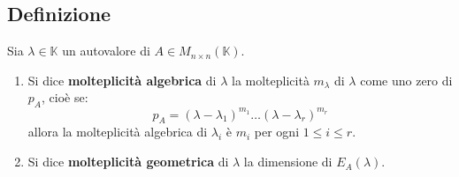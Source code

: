 \documentclass[a4paper]{article}
\theoremstyle{break}
\theoremstyle{break}
\theoremstyle{break}
\theoremstyle{break}
\begin{document}
\subsection{Definizione}
Sia \( \lambda \in \mathbb{K} \) un autovalore di \( A \in M_{n \times n}(\mathbb{K}) \).
\begin{enumerate}
  \item Si dice \textbf{molteplicità algebrica} di \( \lambda \) la molteplicità \( m_\lambda \) 
    di \( \lambda \) come uno zero di \( p_A \), cioè se:
    \[
    p_A = (\lambda - \lambda_1)^{m_1} \ldots (\lambda - \lambda_r)^{m_r}
    \] 
    allora la molteplicità algebrica di \( \lambda_i \) è \( m_i \) per ogni \( 1 \le i \le r \).

  \item Si dice \textbf{molteplicità geometrica} di \( \lambda \) la dimensione di
    \( E_A(\lambda) \).
\end{enumerate}
\end{document}
